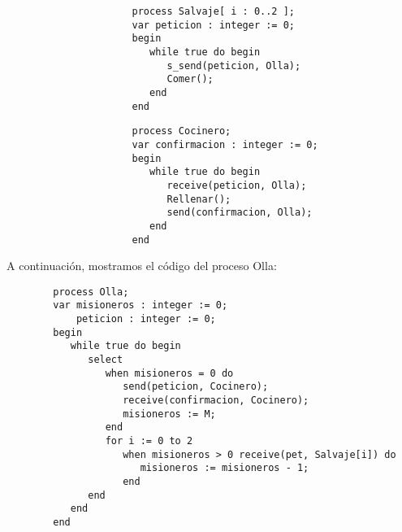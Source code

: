 \begin{ejercicio}
\begin{figure}[H]
        \centering
        \setlength{\columnsep}{1cm}
        \begin{multicols}{2}
            \begin{verbatim}
                process Salvaje[ i : 0..2 ];
                var peticion : integer := 0;
                begin
                   while true do begin
                      s_send(peticion, Olla);
                      Comer();
                   end
                end
            \end{verbatim}
            \begin{verbatim}
                process Cocinero;
                var confirmacion : integer := 0;
                begin
                   while true do begin
                      receive(peticion, Olla);
                      Rellenar();
                      send(confirmacion, Olla);
                   end
                end
            \end{verbatim}
        \end{multicols}
    \end{figure}
    A continuación, mostramos el código del proceso Olla:
    \begin{verbatim}
        process Olla;
        var misioneros : integer := 0;
            peticion : integer := 0;
        begin
           while true do begin
              select 
                 when misioneros = 0 do
                    send(peticion, Cocinero);
                    receive(confirmacion, Cocinero);
                    misioneros := M;
                 end
                 for i := 0 to 2 
                    when misioneros > 0 receive(pet, Salvaje[i]) do
                       misioneros := misioneros - 1;
                    end
              end
           end
        end
    \end{verbatim}
\end{ejercicio}


